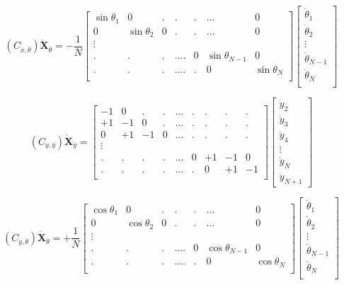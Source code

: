 \documentclass[12pt,letterpaper,titlepage]{article}
\begin{document}
\[
(C_{x,\dot{\theta}}) \mathbf{\dot{X}}_{\dot{\theta}} = - \frac{1}{N} \begin{bmatrix}
\sin\theta_1&0&.&.&.& \hdots &0\\
0&\sin\theta_2&0&.&.& \hdots &0\\
\vdots \\
.&.&.&.\hdots &0&\sin\theta_{N-1}&0\\
.&.&.&.\hdots &.&0&\sin\theta_N\\
\end{bmatrix}
\begin{bmatrix}
\dot{\theta}_1\\
\dot{\theta}_2\\
\vdots\\
\dot{\theta}_{N-1}\\
\dot{\theta}_N\\
\end{bmatrix}
\]

\[
(C_{y,\dot{y}}) \mathbf{\dot{X}}_{\dot{y}} = \begin{bmatrix}
-1&0&.&.&\hdots&.&.&.&.\\
+1&-1&0&.&\hdots&.&.&.&.\\
0&+1&-1&0&\hdots&.&.&.&.\\
\vdots \\
.&.&.&.&\hdots&0&+1&-1&0\\
.&.&.&.&\hdots&.&0&+1&-1\\
\end{bmatrix}
\begin{bmatrix}
\dot{y}_2\\
\dot{y}_3\\
\dot{y}_4\\
\vdots\\
\dot{y}_N\\
\dot{y}_{N+1}
\end{bmatrix}
\]

\[
(C_{y,\dot{\theta}}) \mathbf{\dot{X}}_{\dot{\theta}} = + \frac{1}{N} \begin{bmatrix}
\cos\theta_1&0&.&.&.& \hdots &0\\
0&\cos\theta_2&0&.&.& \hdots &0\\
\vdots \\
.&.&.&.\hdots &0&\cos\theta_{N-1}&0\\
.&.&.&.\hdots &.&0&\cos\theta_N\\
\end{bmatrix}
\begin{bmatrix}
\dot{\theta}_1\\
\dot{\theta}_2\\
\vdots\\
\dot{\theta}_{N-1}\\
\dot{\theta}_N\\
\end{bmatrix}
\]
\end{document}
